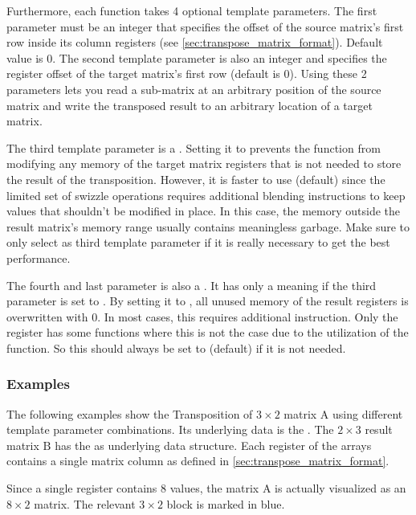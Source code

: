 Furthermore, each function takes 4 optional template parameters.
The first parameter must be an integer that specifies the offset of the source matrix's first row inside its column registers (see \cref{sec:transpose_matrix_format}).
Default value is 0.
The second template parameter is also an integer and specifies the register offset of the target matrix's first row (default is 0).
Using these 2 parameters lets you read a sub-matrix at an arbitrary position of the source matrix and write the transposed result to an arbitrary location of a target matrix.

The third template parameter is a .
Setting it to  prevents the function from modifying any memory of the target matrix registers that is not needed to store the result of the transposition.
However, it is faster to use  (default) since the limited set of swizzle operations requires additional blending instructions to keep values that shouldn't be modified in place.
In this case, the memory outside the result matrix's memory range usually contains meaningless garbage.
Make sure to only select  as third template parameter if it is really necessary to get the best performance.

The fourth and last parameter is also a .
It has only a meaning if the third parameter is set to .
By setting it to , all unused memory of the result registers is overwritten with 0.
In most cases, this requires additional instruction. 
Only the  register has some functions where this is not the case due to the utilization of the  function.
So this should always be set to  (default) if it is not needed.

\subsubsection*{Examples}

The following examples show the Transposition of $3 \times 2$ matrix $\textrm{A}$ using different template parameter combinations. 
Its underlying data is the .
The $2 \times 3$ result matrix $\textrm{B}$ has the  as underlying data structure.
Each register of the arrays contains a single matrix column as defined in \cref{sec:transpose_matrix_format}.

Since a single  register contains 8 values, the matrix $\textrm{A}$ is actually visualized as an $8 \times 2$ matrix.
The relevant $3 \times 2$ block is marked in blue.

